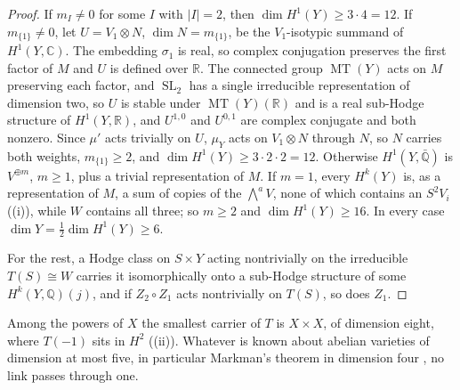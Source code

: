 \documentclass[11pt,reqno]{amsart}
\theoremstyle{plain}
\theoremstyle{definition}
\theoremstyle{remark}
\newcommand{\QQ}{\mathbb{Q}}
\newcommand{\RR}{\mathbb{R}}
\newcommand{\CC}{\mathbb{C}}
\DeclareMathOperator{\MT}{MT}
\DeclareMathOperator{\SL}{SL}
\begin{document}
\begin{proof}
If $m_{I}\ne0$ for some $I$ with $|I|=2$, then $\dim H^{1}(Y)\ge3\cdot4=12$.
If $m_{\{1\}}\ne0$, let $U=V_{1}\otimes N$, $\dim N=m_{\{1\}}$, be the
$V_{1}$-isotypic summand of $H^{1}(Y,\CC)$. The embedding $\sigma_{1}$ is
real, so complex conjugation preserves the first factor of $M$ and $U$ is
defined over $\RR$. The connected group $\MT(Y)$ acts on $M$ preserving each
factor, and $\SL_{2}$ has a single irreducible representation of dimension
two, so $U$ is stable under $\MT(Y)(\RR)$ and is a real sub-Hodge structure
of $H^{1}(Y,\RR)$, and $U^{1,0}$ and $U^{0,1}$ are complex conjugate and
both nonzero. Since $\mu'$ acts trivially on $U$, $\mu_{Y}$ acts on
$V_{1}\otimes N$ through $N$, so $N$ carries both weights, $m_{\{1\}}\ge2$, and
$\dim H^{1}(Y)\ge3\cdot2\cdot2=12$. Otherwise $H^{1}(Y,\bar{\QQ})$ is
$V^{\oplus m}$, $m\ge1$, plus a trivial representation of $M$. If $m=1$,
every $H^{k}(Y)$ is, as a representation of $M$, a sum of copies of the
$\bigwedge^{a}V$, none of which contains an $S^{2}V_{i}$
((i)), while $W$ contains all three; so $m\ge2$ and
$\dim H^{1}(Y)\ge16$. In every case $\dim Y=\frac12\dim H^{1}(Y)\ge6$.

For the rest, a Hodge class on $S\times Y$ acting nontrivially on the
irreducible $T(S)\cong W$ carries it isomorphically onto a sub-Hodge structure
of some $H^{k}(Y,\QQ)(j)$, and if $Z_{2}\circ Z_{1}$ acts nontrivially on
$T(S)$, so does $Z_{1}$.
\end{proof}

Among the powers of $X$ the smallest carrier of $T$ is $X\times X$, of
dimension eight, where $T(-1)$ sits in $H^{2}$
((ii)). Whatever is known about abelian varieties of
dimension at most five, in particular Markman's theorem in dimension four
\cite{Mar25a}, no link passes through one.
\end{document}
